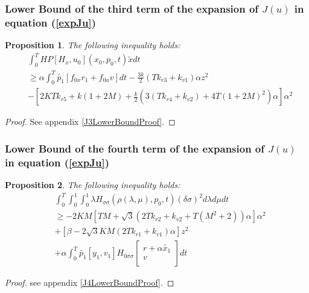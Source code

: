 \documentclass[a4paper,10pt]{article}
\newtheorem{proposition}{Proposition}
\begin{document}
\subsubsection{Lower Bound of the third term of the expansion of 
$J(u)$ in equation (\ref{expJu})}
\begin{proposition}\label{J3LowerBoundProp}
    The following inequality holds:
	\begin{equation}
		\begin{split}
 		&	\int_{0}^{T} HP[H_{x},u_{0}](x_{0},p_{0},t) \tilde{x} dt
		\\ & \geq 
	\alpha \int_{0}^{T} \tilde{p_{1}}[f_{0x}r_{1} + f_{0u}v] dt
	-\frac{3k}{2}(Tk_{r3}+k_{v1}) \alpha z^{2}
	\\
	& -  \left[2KTk_{r5} + k(1+2M) + \frac{k}{2}(3(Tk_{r4}+k_{v2}) 
	+4T(1+2M)^{2}) \alpha\right]\alpha^{2}
	\end{split}
		\label{J3LowerBound}
	\end{equation}
\end{proposition}
\begin{proof}
    See appendix \ref{J3LowerBoundProof}.
\end{proof}

\subsubsection{Lower Bound of the fourth term of the expansion of 
$J(u)$ in equation (\ref{expJu})}
\begin{proposition}\label{J4LowerBoundProp}
    The following inequality holds:
    \begin{equation}
		\begin{split}
    &     \int_{0}^{T} \int_{0}^{1} \int_{0}^{1} \lambda H_{\sigma 
	\sigma}(\rho(\lambda,\mu),p_{0},t)(\delta \sigma)^{2}  
	d \lambda d \mu dt \\ & \geq 
	-2KM \left[TM+\sqrt{3}(2Tk_{r2}+k_{v2}+T(M^{2}+2))\alpha\right] \alpha^{2}
         \\
    &      + \left[\beta - 2\sqrt{3}KM(2Tk_{r1}+k_{v1})\alpha\right] z^{2}
        \\
	& + \alpha \int_{0}^{T} \tilde{p_{1}}\left[y_{1},v_{1}\right]
	H_{0 \sigma \sigma}
	\left[
	\begin{array}
	{c}
	    r+\alpha\tilde{x_{1}}  \\
	    v  \\
	\end{array}
	\right] dt
	\end{split}
	\label{J4LowerBound}
    \end{equation}
\end{proposition}
\begin{proof}
    see appendix \ref{J4LowerBoundProof}.
\end{proof}
\end{document}
